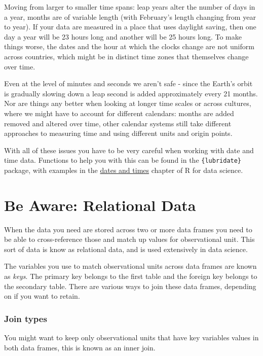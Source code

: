 \documentclass[
  12pt,
]{book}
\begin{document}
Moving from larger to smaller time spans: leap years alter the number of days in a year, months are of variable length (with February's length changing from year to year). If your data are measured in a place that uses daylight saving, then one day a year will be 23 hours long and another will be 25 hours long. To make things worse, the dates and the hour at which the clocks change are not uniform across countries, which might be in distinct time zones that themselves change over time.

Even at the level of minutes and seconds we aren't safe - since the Earth's orbit is gradually slowing down a leap second is added approximately every 21 months. Nor are things any better when looking at longer time scales or across cultures, where we might have to account for different calendars: months are added removed and altered over time, other calendar systems still take different approaches to measuring time and using different units and origin points.

With all of these issues you have to be very careful when working with date and time data. Functions to help you with this can be found in the \texttt{\{lubridate\}} package, with examples in the \href{https://r4ds.had.co.nz/dates-and-times.html\#dates-and-times}{dates and times} chapter of R for data science.

\hypertarget{be-aware-relational-data}{%
\section{Be Aware: Relational Data}\label{be-aware-relational-data}}

When the data you need are stored across two or more data frames you need to be able to cross-reference those and match up values for observational unit. This sort of data is know as relational data, and is used extensively in data science.

The variables you use to match observational units across data frames are known as \emph{keys}. The primary key belongs to the first table and the foreign key belongs to the secondary table. There are various ways to join these data frames, depending on if you want to retain.

\hypertarget{join-types}{%
\subsubsection{Join types}\label{join-types}}

You might want to keep only observational units that have key variables values in both data frames, this is known as an inner join.
\end{document}
